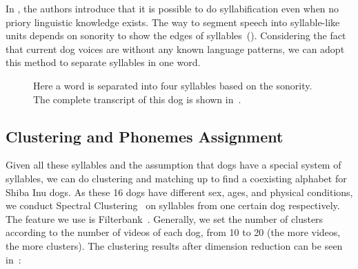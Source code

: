 In \citet{rasanen2018pre}, the authors introduce that it is possible to do 
syllabification even when no priory linguistic knowledge exists. 
The way to segment speech into syllable-like units depends on sonority to 
show the edges of syllables~(). Considering the fact that current 
dog voices are without any known language patterns, we can adopt this method to 
separate syllables in one word.

\begin{figure}[th]
\centering
{}
\caption{Here a word is separated into four syllables based on the sonority. The complete transcript of this dog is shown in~.}
\label{fig:envelop}
\end{figure}

\subsection{Clustering and Phonemes Assignment}
\label{sec:clustering}

Given all these syllables and the assumption that dogs have a special system of syllables, 
we can do clustering and matching up to find a coexisting alphabet for Shiba Inu dogs. 
As these 16 dogs have different sex, ages, and physical conditions, 
we conduct Spectral Clustering~\cite{von2007tutorial} on syllables from 
one certain dog respectively. The feature we use is Filterbank~\cite{strang1996wavelets}. Generally, we set the number of clusters according to the number of videos of each dog, 
from 10 to 20 (the more videos, the more clusters). The clustering results after dimension reduction can be seen in~:


